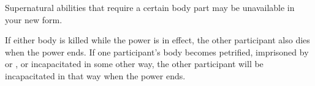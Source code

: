 {	Supernatural abilities that require a certain body part may be unavailable in your new form.

	If either body is killed while the power is in effect, the other participant also dies when the power ends. If one participant's body becomes petrified, imprisoned by  or , or incapacitated in some other way, the other participant will be incapacitated in that way when the power ends.
}
